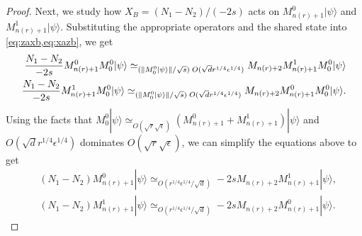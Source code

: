 \documentclass[11pt,letterpaper]{article}
\newcommand{\ket}[1]{|#1\rangle}
\DeclarePairedDelimiter{\norm}{\lVert}{\rVert}
\newcommand{\1}{\mathbb{1}}
\newcommand{\nr}{n(r)}
\newcommand{\se}{\sqrt{\epsilon}}
\newcommand{\qe}{\epsilon^{1/4}}
\newcommand{\sd}{\sqrt{d}}
\newcommand{\sr}{\sqrt{r}}
\newcommand{\qr}{r^{1/4}}
\newcommand{\appd}[1]{\simeq_{#1}}
\theoremstyle{definition}
\begin{document}
\begin{proof}
	Next, we study how $X_B = (N_1-N_2)/(-2s)$ acts on 
	$M_{\nr+1}^0\ket{\psi}$ and $M_{\nr+1}^1 \ket{\psi}$.
	Substituting the appropriate operators and the shared state into \cref{eq:zaxb,eq:xazb}, we get
	\begin{align*}
		\frac{N_1-N_2}{-2s} M_{\nr+1}^0M_0^0 \ket{\psi} 
		\appd{(\norm{M_0^0\ket{\psi}}/\sqrt{s})\;O(\sd \qr \qe)}M_{\nr+2} M_{\nr+1}^1M_0^0\ket{\psi}\\
		\frac{N_1 -N_2}{-2s} M_{\nr+1}^1M_0^0 \ket{\psi}  
		\appd{(\norm{M_0^0 \ket{\psi}}/\sqrt{s})\;O(\sd \qr \qe)}M_{\nr+2} M_{\nr+1}^0 M_0^0 \ket{\psi}.
	\end{align*}
	Using the facts that $M_0^0 \ket{\psi} \appd{O(\sr \se)} (M_{\nr+1}^0 + M_{\nr+1}^1) \ket{\psi}$
	and $O(\sd \qr \qe)$ dominates $O(\sr \se)$, we can
	simplify the equations above to get
	\begin{align}
		\label{eq:n1-n20}
		&(N_1-N_2) M_{\nr+1}^0 \ket{\psi} \appd{O(\qr\qe/\sd )} -2sM_{\nr+2} M_{\nr+1}^1 \ket{\psi},\\
		\label{eq:n1-n21}
		&(N_1-N_2) M_{\nr+1}^1 \ket{\psi}\appd{O(\qr\qe/\sd )} -2sM_{\nr+2} M_{\nr+1}^0 \ket{\psi}.
	\end{align}
	

\end{proof}
\end{document}
